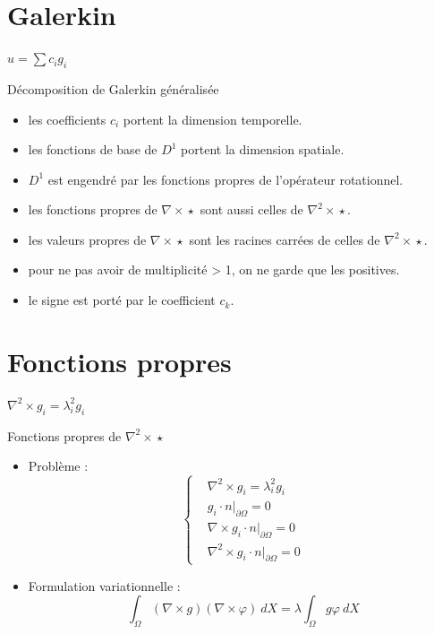 \documentclass{beamer}
\newcommand{\rot}{{\nabla\times}}
\newcommand{\rott}{{\nabla^2\times}}
\newcommand{\restr}{{\big\rvert_{\partial\Omega}}}
\begin{document}
\section{Galerkin}
\begin{frame}{$u=\sum c_ig_i$}
\begin{block}{Décomposition de Galerkin généralisée}
\begin{itemize}
\item les coefficients $c_i$ portent la dimension temporelle.
\item les fonctions de base de $D^1$ portent la dimension spatiale.
\item $D^1$ est engendré par les fonctions propres de l'opérateur rotationnel.
\item les fonctions propres de $\rot\star$ sont aussi celles de $\rott\star$.
\item les valeurs propres de $\rot\star$ sont les racines carrées de celles de $\rott\star$.
\item pour ne pas avoir de multiplicité > 1, on ne garde que les positives.
\item le signe est porté par le coefficient $c_k$.
\end{itemize}
\end{block}
\end{frame}

\section{Fonctions propres}
\begin{frame}{$\rott  g_i = \lambda_i^2 g_i$}
\begin{block}{Fonctions propres de $\rott\star$}
\begin{itemize}
\item Problème :
\[
\left\{
\begin{aligned}
&\rott  g_i = \lambda_i^2 g_i\\
&g_i\cdot n\restr = 0\\
&\rot g_i\cdot n\restr = 0\\
&\rott  g_i\cdot n\restr = 0
\end{aligned}
\right.
\]
\item Formulation variationnelle :
\[
\int_\Omega (\rot g)(\rot\varphi)\ dX = \lambda\int_\Omega g\varphi\ dX
\]
\end{itemize}
\end{block}
\end{frame}
\end{document}
